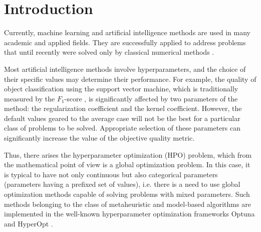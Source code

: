 \documentclass[runningheads]{llncs}
\begin{document}
\section{Introduction}

Currently, machine learning and artificial intelligence methods are used in many academic and applied fields. They are successfully applied to address problems that until recently were solved only by classical numerical methods \cite{Blechschmidt2021,Seleznev2019,Xu2020}. 

Most artificial intelligence methods involve hyperparameters, and the choice of their specific values may determine their performance. For example, the quality of object classification using the support vector machine, which is traditionally measured by the $F_1$-score \cite{NIPS2015}, is significantly affected by two parameters of the method: the regularization coefficient and the kernel coefficient. However, the default values geared to the average case will not be the best for a particular class of problems to be solved. Appropriate selection of these parameters can significantly increase the value of the objective quality metric.

Thus, there arises the hyperparameter optimization (HPO) problem, which from the mathematical point of view is a global optimization problem. In this case, it is typical to have not only continuous but also categorical parameters (parameters having a prefixed set of values), i.e. there is a need to use global optimization methods capable of solving problems with mixed parameters. 
Such methods belonging to the class of metaheuristic and model-based algorithms are implemented in the well-known hyperparameter optimization frameworks Optuna \cite{optuna} and HyperOpt \cite{hyperopt}.
\end{document}
